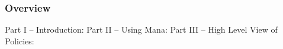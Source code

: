\documentclass[t,hyperref={pdfpagelabels=false},9pt]{beamer}
\begin{document}
\begin{frame}
\titlepage %
\end{frame}


\begin{frame}
\frametitle{Overview} %
Part I -- Introduction:
\tableofcontents[part=1,hideallsubsections]
Part II -- Using Mana:
\tableofcontents[part=2,hideallsubsections]
Part III -- High Level View of Policies:
\tableofcontents[part=3,hideallsubsections]

\tableofcontents[] %
\end{frame}






%
%
%
%

%
%
\end{document}
